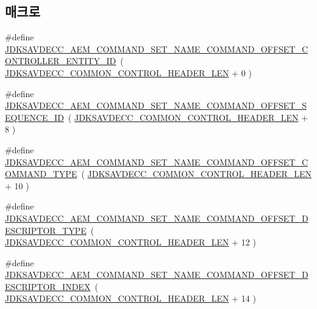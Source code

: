 \subsection*{매크로}
\begin{DoxyCompactItemize}
\item 
\#define \hyperlink{group__command__set__name_ga034b72258f43453a333743aaca8b22be}{J\+D\+K\+S\+A\+V\+D\+E\+C\+C\+\_\+\+A\+E\+M\+\_\+\+C\+O\+M\+M\+A\+N\+D\+\_\+\+S\+E\+T\+\_\+\+N\+A\+M\+E\+\_\+\+C\+O\+M\+M\+A\+N\+D\+\_\+\+O\+F\+F\+S\+E\+T\+\_\+\+C\+O\+N\+T\+R\+O\+L\+L\+E\+R\+\_\+\+E\+N\+T\+I\+T\+Y\+\_\+\+ID}~( \hyperlink{group__jdksavdecc__avtp__common__control__header_gaae84052886fb1bb42f3bc5f85b741dff}{J\+D\+K\+S\+A\+V\+D\+E\+C\+C\+\_\+\+C\+O\+M\+M\+O\+N\+\_\+\+C\+O\+N\+T\+R\+O\+L\+\_\+\+H\+E\+A\+D\+E\+R\+\_\+\+L\+EN} + 0 )
\item 
\#define \hyperlink{group__command__set__name_gad44034c2914962d6b4324a10eca6b1f2}{J\+D\+K\+S\+A\+V\+D\+E\+C\+C\+\_\+\+A\+E\+M\+\_\+\+C\+O\+M\+M\+A\+N\+D\+\_\+\+S\+E\+T\+\_\+\+N\+A\+M\+E\+\_\+\+C\+O\+M\+M\+A\+N\+D\+\_\+\+O\+F\+F\+S\+E\+T\+\_\+\+S\+E\+Q\+U\+E\+N\+C\+E\+\_\+\+ID}~( \hyperlink{group__jdksavdecc__avtp__common__control__header_gaae84052886fb1bb42f3bc5f85b741dff}{J\+D\+K\+S\+A\+V\+D\+E\+C\+C\+\_\+\+C\+O\+M\+M\+O\+N\+\_\+\+C\+O\+N\+T\+R\+O\+L\+\_\+\+H\+E\+A\+D\+E\+R\+\_\+\+L\+EN} + 8 )
\item 
\#define \hyperlink{group__command__set__name_ga50d48d963d6ce083bf3d656e450a6ca4}{J\+D\+K\+S\+A\+V\+D\+E\+C\+C\+\_\+\+A\+E\+M\+\_\+\+C\+O\+M\+M\+A\+N\+D\+\_\+\+S\+E\+T\+\_\+\+N\+A\+M\+E\+\_\+\+C\+O\+M\+M\+A\+N\+D\+\_\+\+O\+F\+F\+S\+E\+T\+\_\+\+C\+O\+M\+M\+A\+N\+D\+\_\+\+T\+Y\+PE}~( \hyperlink{group__jdksavdecc__avtp__common__control__header_gaae84052886fb1bb42f3bc5f85b741dff}{J\+D\+K\+S\+A\+V\+D\+E\+C\+C\+\_\+\+C\+O\+M\+M\+O\+N\+\_\+\+C\+O\+N\+T\+R\+O\+L\+\_\+\+H\+E\+A\+D\+E\+R\+\_\+\+L\+EN} + 10 )
\item 
\#define \hyperlink{group__command__set__name_ga91e53d5d14c37d26c62d74cada1323bf}{J\+D\+K\+S\+A\+V\+D\+E\+C\+C\+\_\+\+A\+E\+M\+\_\+\+C\+O\+M\+M\+A\+N\+D\+\_\+\+S\+E\+T\+\_\+\+N\+A\+M\+E\+\_\+\+C\+O\+M\+M\+A\+N\+D\+\_\+\+O\+F\+F\+S\+E\+T\+\_\+\+D\+E\+S\+C\+R\+I\+P\+T\+O\+R\+\_\+\+T\+Y\+PE}~( \hyperlink{group__jdksavdecc__avtp__common__control__header_gaae84052886fb1bb42f3bc5f85b741dff}{J\+D\+K\+S\+A\+V\+D\+E\+C\+C\+\_\+\+C\+O\+M\+M\+O\+N\+\_\+\+C\+O\+N\+T\+R\+O\+L\+\_\+\+H\+E\+A\+D\+E\+R\+\_\+\+L\+EN} + 12 )
\item 
\#define \hyperlink{group__command__set__name_ga30421fd8529e96a9f7abcf45318feed9}{J\+D\+K\+S\+A\+V\+D\+E\+C\+C\+\_\+\+A\+E\+M\+\_\+\+C\+O\+M\+M\+A\+N\+D\+\_\+\+S\+E\+T\+\_\+\+N\+A\+M\+E\+\_\+\+C\+O\+M\+M\+A\+N\+D\+\_\+\+O\+F\+F\+S\+E\+T\+\_\+\+D\+E\+S\+C\+R\+I\+P\+T\+O\+R\+\_\+\+I\+N\+D\+EX}~( \hyperlink{group__jdksavdecc__avtp__common__control__header_gaae84052886fb1bb42f3bc5f85b741dff}{J\+D\+K\+S\+A\+V\+D\+E\+C\+C\+\_\+\+C\+O\+M\+M\+O\+N\+\_\+\+C\+O\+N\+T\+R\+O\+L\+\_\+\+H\+E\+A\+D\+E\+R\+\_\+\+L\+EN} + 14 )

\end{DoxyCompactItemize}

